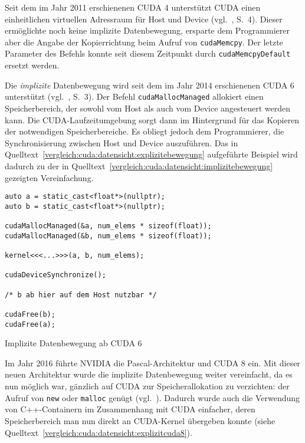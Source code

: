 Seit dem im Jahr 2011 erschienenen CUDA 4 unterstützt CUDA einen einheitlichen
virtuellen Adressraum für Host und Device (vgl.~\cite{cuda2011}, S.\ 4). Dieser
ermöglichte noch keine implizite Datenbewegung, ersparte dem Programmierer
aber die Angabe der Kopierrichtung beim Aufruf von
\texttt{cudaMemcpy}. Der letzte Parameter des Befehls konnte seit
diesem Zeitpunkt durch \texttt{cudaMemcpyDefault} ersetzt werden.

Die \textit{implizite} Datenbewegung wird seit dem im Jahr 2014 erschienenen
CUDA 6 unterstützt (vgl.~\cite{cuda2014}, S.\ 3). Der Befehl
\texttt{cudaMallocManaged} allokiert einen Speicherbereich, der sowohl
vom Host als auch vom Device angesteuert werden kann. Die CUDA-Laufzeitumgebung
sorgt dann im Hintergrund für das Kopieren der notwendigen Speicherbereiche. Es
obliegt jedoch dem Programmierer, die Synchronisierung zwischen Host und Device
auszuführen. Das in Quelltext~\ref{vergleich:cuda:datensicht:explizitebewegung}
aufgeführte Beispiel wird dadurch zu der in
Quelltext~\ref{vergleich:cuda:datensicht:implizitebewegung} gezeigten
Vereinfachung.

\begin{code}
    \begin{verbatim}
auto a = static_cast<float*>(nullptr);
auto b = static_cast<float*>(nullptr);

cudaMallocManaged(&a, num_elems * sizeof(float));
cudaMallocManaged(&b, num_elems * sizeof(float));

kernel<<<...>>>(a, b, num_elems);

cudaDeviceSynchronize();

/* b ab hier auf dem Host nutzbar */

cudaFree(b);
cudaFree(a);
    \end{verbatim}
    \caption{Implizite Datenbewegung ab CUDA 6}
    \label{vergleich:cuda:datensicht:implizitebewegung}
\end{code}

Im Jahr 2016 führte NVIDIA die Pascal-Architektur und CUDA 8 ein. Mit dieser
neuen Architektur wurde die implizite Datenbewegung weiter vereinfacht, da es
nun möglich war, gänzlich auf CUDA zur Speicherallokation zu verzichten: der
Aufruf von \texttt{new} oder \texttt{malloc} genügt
(vgl.~\cite{harris2016}). Dadurch wurde auch die Verwendung von C++-Containern
im Zusammenhang mit CUDA einfacher, deren Speicherbereich man nun direkt an
CUDA-Kernel übergeben konnte (siehe
Quelltext~\ref{vergleich:cuda:datensicht:explizitcuda8}).

